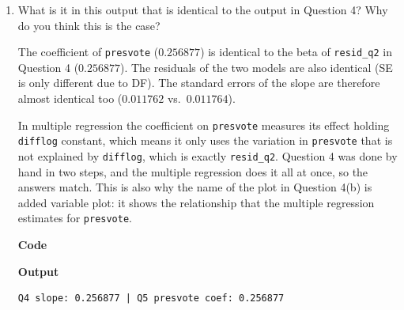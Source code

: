 \documentclass[12pt,letterpaper]{article}
\begin{document}
\begin{enumerate}
		\textbf{Code}
		
		\vspace{.5cm}
		\textbf{Output}
		\begin{verbatim}
(Intercept)     difflog    presvote 
 0.44864422  0.03554309  0.25687701 
		\end{verbatim}

		\vspace{1cm}
		\item What is it in this output that is identical to the output in Question 4? Why do you think this is the case?
		\vspace{.5cm}

		The coefficient of \texttt{presvote} ($0.256877$) is identical to the beta of \texttt{resid\_q2} in Question 4 ($0.256877$). The residuals of the two models are also identical (SE is only different due to DF). The standard errors of the slope are therefore almost identical too ($0.011762$ vs.\ $0.011764$).

		\vspace{.5cm}
		In multiple regression the coefficient on \texttt{presvote} measures its effect holding \texttt{difflog} constant, which means it only uses the variation in \texttt{presvote} that is not explained by \texttt{difflog}, which is exactly \texttt{resid\_q2}. Question 4 was done by hand in two steps, and the multiple regression does it all at once, so the answers match. This is also why the name of the plot in Question 4(b) is added variable plot: it shows the relationship that the multiple regression estimates for \texttt{presvote}.
		\vspace{.5cm}

		\textbf{Code}
		
		\vspace{.5cm}
		\textbf{Output}
		\begin{verbatim}
Q4 slope: 0.256877 | Q5 presvote coef: 0.256877
		\end{verbatim}
	\end{enumerate}
\end{document}
